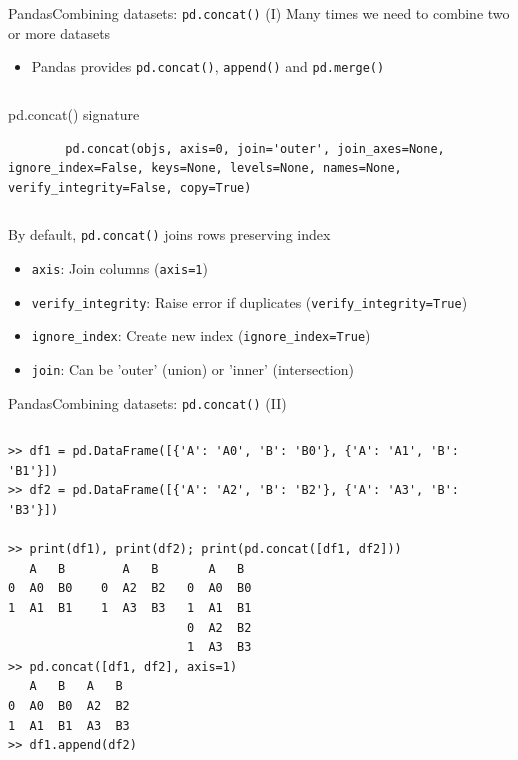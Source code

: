 \documentclass[10pt,compress]{beamer} %
\begin{document}
\begin{frame}[fragile]{Pandas}{Combining datasets: \texttt{pd.concat()} (I)}
	Many times we need to combine two or more datasets
	\begin{itemize}
		\item Pandas provides \texttt{pd.concat()}, \texttt{append()} and \texttt{pd.merge()}
	\end{itemize}

	\begin{columns}
	\begin{block}{pd.concat() signature}
	\vspace{-0.2cm} 
		\begin{lstlisting}
		pd.concat(objs, axis=0, join='outer', join_axes=None, ignore_index=False, keys=None, levels=None, names=None, verify_integrity=False, copy=True)
		\end{lstlisting}
		\vspace{-0.2cm} 
	\end{block}
	\end{columns}

	By default, \texttt{pd.concat()} joins rows preserving index
	\begin{itemize}
		\item \texttt{axis}: Join columns (\texttt{axis=1})
		\item \texttt{verify\_integrity}: Raise error if duplicates (\texttt{verify\_integrity=True})
		\item \texttt{ignore\_index}: Create new index (\texttt{ignore\_index=True})
		\item \texttt{join}: Can be 'outer' (union) or 'inner' (intersection)
	\end{itemize}
\end{frame}

\begin{frame}[fragile]{Pandas}{Combining datasets: \texttt{pd.concat()} (II)}
	\begin{columns}
 	   \column{1.1\textwidth}
		\begin{exampleblock}{}
		\vspace{-0.2cm} 
			\begin{lstlisting}
>> df1 = pd.DataFrame([{'A': 'A0', 'B': 'B0'}, {'A': 'A1', 'B': 'B1'}])
>> df2 = pd.DataFrame([{'A': 'A2', 'B': 'B2'}, {'A': 'A3', 'B': 'B3'}])

>> print(df1), print(df2); print(pd.concat([df1, df2]))
   A   B        A   B       A   B
0  A0  B0    0  A2  B2   0  A0  B0
1  A1  B1    1  A3  B3   1  A1  B1
                         0  A2  B2
                         1  A3  B3
>> pd.concat([df1, df2], axis=1)
   A   B   A   B
0  A0  B0  A2  B2
1  A1  B1  A3  B3
>> df1.append(df2)
			\end{lstlisting}
			\vspace{-0.2cm} 
		\end{exampleblock}
		\end{columns}
\end{frame}
\end{document}

